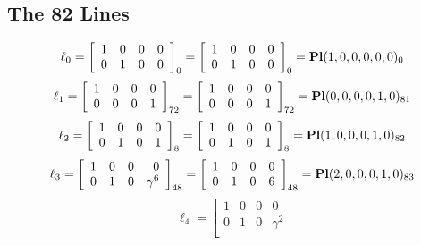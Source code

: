 \documentclass{article}
\begin{document}
{\subsection*{The 82 Lines}
$$
\ell_{0} = 
\left[
\begin{array}{*{4}{r}}
1 & 0 & 0 & 0\\
0 & 1 & 0 & 0\\
\end{array}
\right]
_{0}
=
\left[
\begin{array}{*{4}c}
1  & 0  & 0  & 0\\
0  & 1  & 0  & 0\\
\end{array}
\right]_{0}
={\rm\bf Pl}(1,0,0,0,0,0 )_{0}$$
$$
\ell_{1} = 
\left[
\begin{array}{*{4}{r}}
1 & 0 & 0 & 0\\
0 & 0 & 0 & 1\\
\end{array}
\right]
_{72}
=
\left[
\begin{array}{*{4}c}
1  & 0  & 0  & 0\\
0  & 0  & 0  & 1\\
\end{array}
\right]_{72}
={\rm\bf Pl}(0,0,0,0,1,0 )_{81}$$
$$
\ell_{2} = 
\left[
\begin{array}{*{4}{r}}
1 & 0 & 0 & 0\\
0 & 1 & 0 & 1\\
\end{array}
\right]
_{8}
=
\left[
\begin{array}{*{4}c}
1  & 0  & 0  & 0\\
0  & 1  & 0  & 1\\
\end{array}
\right]_{8}
={\rm\bf Pl}(1,0,0,0,1,0 )_{82}$$
$$
\ell_{3} = 
\left[
\begin{array}{*{4}{r}}
1 & 0 & 0 & 0\\
0 & 1 & 0 & \gamma^{6}\\
\end{array}
\right]
_{48}
=
\left[
\begin{array}{*{4}c}
1  & 0  & 0  & 0\\
0  & 1  & 0  & 6\\
\end{array}
\right]_{48}
={\rm\bf Pl}(2,0,0,0,1,0 )_{83}$$
$$
\ell_{4} = 
\left[
\begin{array}{*{4}{r}}
1 & 0 & 0 & 0\\
0 & 1 & 0 & \gamma^{2}\\
\end{array}
$$}
\end{document}
